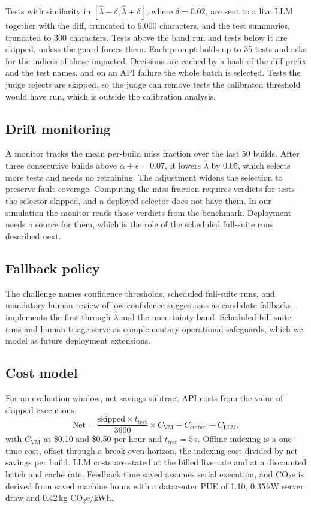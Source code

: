 Tests with similarity in $[\hat\lambda - \delta, \hat\lambda + \delta]$, where $\delta = 0.02$, are sent to a live LLM together with the diff, truncated to 6,000 characters, and the test summaries, truncated to 300 characters. Tests above the band run and tests below it are skipped, unless the guard forces them. Each prompt holds up to 35 tests and asks for the indices of those impacted. Decisions are cached by a hash of the diff prefix and the test names, and on an API failure the whole batch is selected. Tests the judge rejects are skipped, so the judge can remove tests the calibrated threshold would have run, which is outside the calibration analysis.

\subsection{Drift monitoring}
\label{sec:drift}

A monitor tracks the mean per-build miss fraction over the last 50 builds. After three consecutive builds above $\alpha + \epsilon = 0.07$, it lowers $\hat\lambda$ by 0.05, which selects more tests and needs no retraining. The adjustment widens the selection to preserve fault coverage. Computing the miss fraction requires verdicts for tests the selector skipped, and a deployed selector does not have them. In our simulation the monitor reads those verdicts from the benchmark. Deployment needs a source for them, which is the role of the scheduled full-suite runs described next.

\subsection{Fallback policy}
\label{sec:fallback}

The challenge names confidence thresholds, scheduled full-suite runs, and mandatory human review of low-confidence suggestions as candidate fallbacks~\cite{challenge}. \tool{} implements the first through $\hat\lambda$ and the uncertainty band. Scheduled full-suite runs and human triage serve as complementary operational safeguards, which we model as future deployment extensions.

\subsection{Cost model}
\label{sec:costmodel}

For an evaluation window, net savings subtract API costs from the value of skipped executions,
\begin{equation}
\text{Net} = \frac{\text{skipped} \times t_{\text{test}}}{3600} \times C_{\text{VM}} - C_{\text{embed}} - C_{\text{LLM}},
\end{equation}
with $C_{\text{VM}}$ at \$0.10 and \$0.50 per hour and $t_{\text{test}} = 5$\,s. Offline indexing is a one-time cost, offset through a break-even horizon, the indexing cost divided by net savings per build. LLM costs are stated at the billed live rate and at a discounted batch and cache rate. Feedback time saved assumes serial execution, and CO$_2$e is derived from saved machine hours with a datacenter PUE of 1.10, 0.35\,kW server draw and 0.42\,kg CO$_2$e/kWh.
